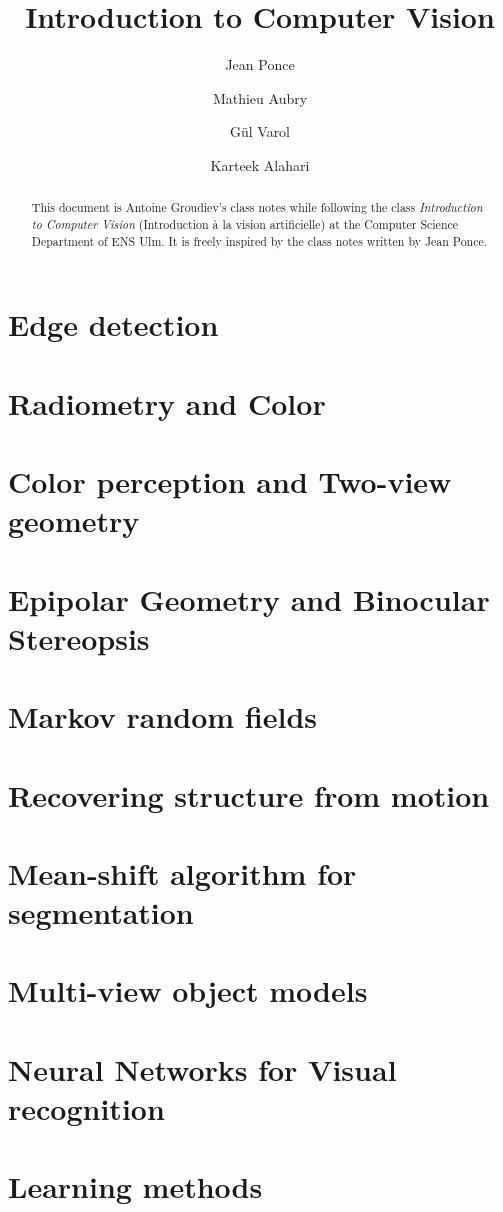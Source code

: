 \documentclass[toc, titlepaged]{../cs-classes/cs-classes}
\title{Introduction to Computer Vision}
\author{Jean Ponce\and Mathieu Aubry\and Gül Varol\and Karteek Alahari}
\begin{document}
\begin{abstract}
    This document is Antoine Groudiev's class notes while following the class \emph{Introduction to Computer Vision} (Introduction à la vision artificielle) at the Computer Science Department of ENS Ulm. It is freely inspired by the class notes written by Jean Ponce.
\end{abstract}






\section{Edge detection}

\section{Radiometry and Color}

\section{Color perception and Two-view geometry}

\section{Epipolar Geometry and Binocular Stereopsis}

\section{Markov random fields}

\section{Recovering structure from motion}

\section{Mean-shift algorithm for segmentation}

\section{Multi-view object models}

\section{Neural Networks for Visual recognition}

\section{Learning methods}
\end{document}
